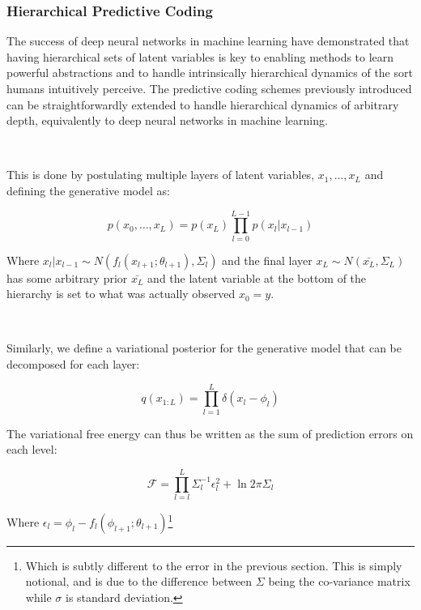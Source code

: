 \documentclass{article}
\begin{document}
\subsubsection{Hierarchical Predictive Coding}

The success of deep neural networks in machine learning have demonstrated that having hierarchical sets of latent variables is key to enabling methods to learn powerful abstractions and to handle intrinsically hierarchical dynamics of the sort humans intuitively perceive. The predictive coding schemes previously introduced can be straightforwardly extended to handle hierarchical dynamics of arbitrary depth, equivalently to deep neural networks in machine learning.

\

This is done by postulating multiple layers of latent variables, $x_1, \dots, x_L$ and defining the generative model as:

\begin{equation}
	p(x_0, \dots, x_L) = p(x_L) \prod_{l = 0}^{L - 1} p(x_l | x_{l-1})
\end{equation}

Where $x_l | x_{l - 1} \sim N(f_l(x_{l + 1}; \theta_{l + 1}) , \Sigma_l)$ and the final layer $x_L \sim N(\bar{x_L}, \Sigma_L)$ has some arbitrary prior $\bar{x_L}$ and the latent variable at the bottom of the hierarchy is set to what was actually observed $x_0 = y$. 

\

Similarly, we define a variational posterior for the generative model that can be decomposed for each layer:

\begin{equation}
	q(x_{1:L}) = \prod^L_{l = 1} \delta(x_l - \phi_l)
\end{equation}

The variational free energy can thus be written as the sum of prediction errors on each level:

\begin{equation}\label{eq:vfe_pc_hierarchical}
\mathcal{F} = \prod_{l = l}^{L} \Sigma_l^{-1} \epsilon_l^2 + \ln 2 \pi \Sigma_l
\end{equation}

Where $\epsilon_l = \phi_l - f_l(\phi_{l + 1}; \theta_{l + 1})$\footnote{Which is subtly different to the error in the previous section. This is simply notional, and is due to the difference between $\Sigma$ being the co-variance matrix while $\sigma$ is standard deviation.}
\end{document}

